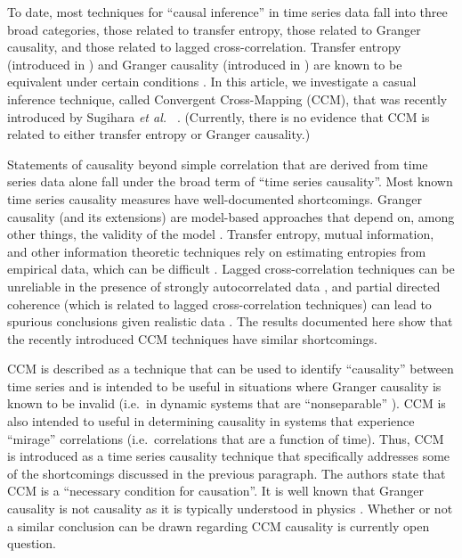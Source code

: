 \documentclass[twocolumn,aps,pre,groupedaddress]{revtex4-1}
\begin{document}
To date, most techniques for ``causal inference'' in time series data fall into three broad categories, those related to transfer entropy, those related to Granger causality, and those related to lagged cross-correlation.  Transfer entropy (introduced in \cite{Schreiber2000}) and Granger causality (introduced in \cite{granger1969}) are known to be equivalent under certain conditions \cite{Barnett2009}.  In this article, we investigate a casual inference technique, called Convergent Cross-Mapping (CCM), that was recently introduced by Sugihara {\em et al.\ } \cite{Sugihara2012}.  (Currently, there is no evidence that CCM is related to either transfer entropy or Granger causality.)

Statements of causality beyond simple correlation that are derived from time series data alone fall under the broad term of ``time series causality''.  Most known time series causality measures have well-documented shortcomings.  Granger causality (and its extensions) are model-based approaches that depend on, among other things, the validity of the model \cite{Kaminski2001,Granger1980}.  Transfer entropy, mutual information, and other information theoretic techniques rely on estimating entropies from empirical data, which can be difficult \cite{Kaiser2002,Schindler2007}.  Lagged cross-correlation techniques can be unreliable in the presence of strongly autocorrelated data \cite{box2013}, and partial directed coherence (which is related to lagged cross-correlation techniques) can lead to spurious conclusions given realistic data \cite{pascual2014}.  The results documented here show that the recently introduced CCM techniques have similar shortcomings.  

CCM is described as a technique that can be used to identify ``causality'' between time series and is intended to be useful in situations where Granger causality is known to be invalid (i.e.\ in dynamic systems that are ``nonseparable'' \cite{Sugihara2012}).  CCM is also intended to useful in determining causality in systems that experience ``mirage'' correlations \cite{Sugihara2012} (i.e.\ correlations that are a function of time).  Thus, CCM is introduced as a time series causality technique that specifically addresses some of the shortcomings discussed in the previous paragraph.  The authors state that CCM is a ``necessary condition for causation''.  It is well known that Granger causality is not causality as it is typically understood in physics \cite{Granger1980,liu2012,Roberts1985}.  Whether or not a similar conclusion can be drawn regarding CCM causality is currently open question. 
\end{document}
